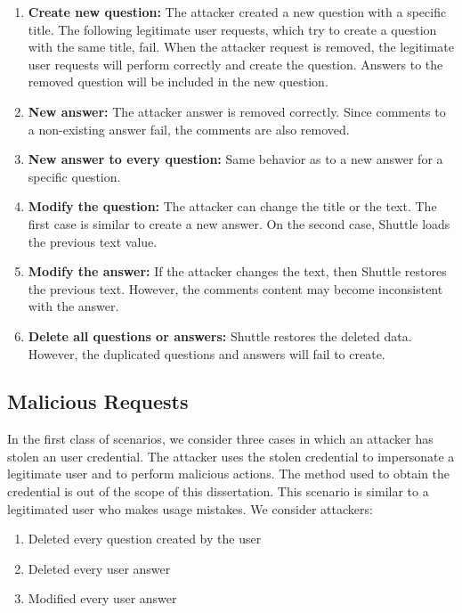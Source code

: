 \begin{enumerate}
  \item \textbf{Create new question:} The attacker created a new question with a specific title. The following legitimate user requests, which try to create a question with the same title, fail. When the attacker request is removed, the legitimate user requests will perform correctly and create the question. Answers to the removed question will be included in the new question.
  \item \textbf{New answer:} The attacker answer is removed correctly. Since comments to a non-existing answer fail, the comments are also removed.
  \item \textbf{New answer to every question:} Same behavior as to a new answer for a specific question.
  \item \textbf{Modify the question:} The attacker can change the title or the text. The first case is similar to create a new answer. On the second case, Shuttle loads the previous text value.
  \item \textbf{Modify the answer:} If the attacker changes the text, then Shuttle restores the previous text. However, the comments content may become inconsistent with the answer.
  \item \textbf{Delete all questions or answers:} Shuttle restores the deleted data. However, the duplicated questions and answers will fail to create.
\end{enumerate}


\subsection{Malicious Requests}\label{sec:eval:accuracy:requests}
In the first class of scenarios, we consider three cases in which an attacker has stolen an user credential. The attacker uses the stolen credential to impersonate a legitimate user and to perform malicious actions. The method used to obtain the credential is out of the scope of this dissertation. This scenario is similar to a legitimated user who makes usage mistakes.
We consider attackers:

\begin{enumerate}[label=\alph*]
  \item Deleted every question created by the user
  \item Deleted every user answer
  \item Modified every user answer
\end{enumerate}



